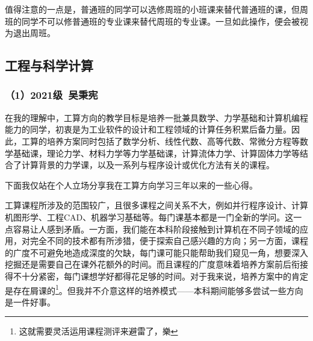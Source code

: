 \vspace{10pt}

值得注意的一点是，普通班的同学可以选修周班的小班课来替代普通班的课，但周班的同学不可以修普通班的专业课来替代周班的专业课。一旦如此操作，便会被视为退出周班。

\subsection{工程与科学计算}
\subsubsection{（1）2021级\ 吴秉宪}

在我的理解中，工算方向的教学目标是培养一批兼具数学、力学基础和计算机编程能力的同学，初衷是为工业软件的设计和工程领域的计算任务积累后备力量。因此，工算的培养方案同时包括了数学分析、线性代数、高等代数、常微分方程等数学基础课，理论力学、材料力学等力学基础课，计算流体力学、计算固体力学等结合了计算背景的力学课，以及一系列与程序设计或优化方法有关的课程。

\vspace{10pt}

下面我仅站在个人立场分享我在工算方向学习三年以来的一些心得。

\vspace{10pt}

工算课程所涉及的范围较广，且很多课程之间关系不大，例如并行程序设计、计算机图形学、工程CAD、机器学习基础等。每门课基本都是一门全新的学问。这一点容易让人感到矛盾。一方面，我们能在本科阶段接触到计算机在不同子领域的应用，对完全不同的技术都有所涉猎，便于探索自己感兴趣的方向；另一方面，课程的广度不可避免地造成深度的欠缺，每门课可能只能帮助我们窥见一角，想要深入挖掘还是需要自己在课外花额外的时间。而且课程的广度意味着培养方案前后衔接得不十分紧密，每门课想学好都得花足够的时间。对于我来说，培养方案中的肯定是存在屑课的\footnote{这就需要灵活运用课程测评来避雷了，樂}。但我并不介意这样的培养模式——本科期间能够多尝试一些方向是一件好事。

\vspace{10pt}

